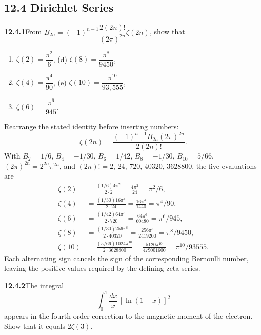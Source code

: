 \subsection*{12.4 Dirichlet Series}

\par\bigskip
\noindent\textbf{12.4.1}\quad From
$B_{2n}=(-1)^{n-1}\dfrac{2(2n)!}{(2\pi)^{2n}}\zeta(2n)$, show that
\begin{enumerate}
\item[(a)] $\zeta(2)=\dfrac{\pi^{2}}{6}$,\qquad
(d) $\zeta(8)=\dfrac{\pi^{8}}{9450}$,
\item[(b)] $\zeta(4)=\dfrac{\pi^{4}}{90}$,\qquad
(e) $\zeta(10)=\dfrac{\pi^{10}}{93{,}555}$,
\item[(c)] $\zeta(6)=\dfrac{\pi^{6}}{945}$.
\end{enumerate}
\solution
Rearrange the stated identity before inserting numbers:
\[
\zeta(2n)=\frac{(-1)^{n-1}B_{2n}(2\pi)^{2n}}{2(2n)!}.
\]
With $B_2=1/6$, $B_4=-1/30$, $B_6=1/42$, $B_8=-1/30$,
$B_{10}=5/66$, $(2\pi)^{2n}=2^{2n}\pi^{2n}$, and
$(2n)!=2,\,24,\,720,\,40320,\,3628800$, the five evaluations are
\begin{align*}
\zeta(2)&=\frac{(1/6)4\pi^2}{2\cdot2}=\frac{4\pi^2}{24}
=\boxed{\pi^2/6},\\
\zeta(4)&=\frac{(1/30)16\pi^4}{2\cdot24}=\frac{16\pi^4}{1440}
=\boxed{\pi^4/90},\\
\zeta(6)&=\frac{(1/42)64\pi^6}{2\cdot720}=\frac{64\pi^6}{60480}
=\boxed{\pi^6/945},\\
\zeta(8)&=\frac{(1/30)256\pi^8}{2\cdot40320}=\frac{256\pi^8}{2419200}
=\boxed{\pi^8/9450},\\
\zeta(10)&=\frac{(5/66)1024\pi^{10}}{2\cdot3628800}
=\frac{5120\pi^{10}}{479001600}
=\boxed{\pi^{10}/93555}.
\end{align*}
Each alternating sign cancels the sign of the corresponding Bernoulli
number, leaving the positive values required by the defining zeta series.

\par\bigskip
\noindent\textbf{12.4.2}\quad The integral
\[
\int_{0}^{1}\frac{dx}{x}\,[\ln(1-x)]^{2}
\]
appears in the fourth-order correction to the magnetic moment of the
electron. Show that it equals $2\zeta(3)$.

